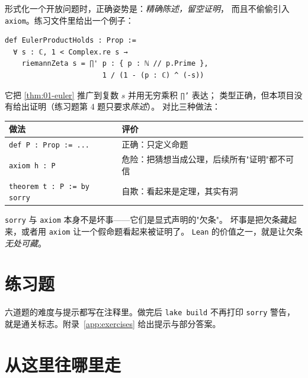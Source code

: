 形式化一个开放问题时，正确姿势是：\emph{精确陈述，留空证明}，
而且不偷偷引入 \texttt{axiom}。练习文件里给出一个例子：

\begin{lstlisting}[language=Lean,numbers=none,frame=none,xleftmargin=0pt]
def EulerProductHolds : Prop :=
  ∀ s : ℂ, 1 < Complex.re s →
    riemannZeta s = ∏' p : { p : ℕ // p.Prime },
                       1 / (1 - (p : ℂ) ^ (-s))
\end{lstlisting}

它把 \cref{thm:01-euler} 推广到复数 $s$ 并用无穷乘积 \texttt{∏'} 表达；
类型正确，但本项目没有给出证明（练习题第 4 题只要求\emph{陈述}）。
对比三种做法：

\begin{center}\small
\begin{tabular}{@{}p{}p{}@{}}
\toprule
\textbf{做法} & \textbf{评价}\\
\midrule
\texttt{def P : Prop := ...} & 正确：只定义命题\\
\texttt{axiom h : P} & 危险：把猜想当成公理，后续所有"证明"都不可信\\
\texttt{theorem t : P := by sorry} & 自欺：看起来是定理，其实有洞\\
\bottomrule
\end{tabular}
\end{center}

\begin{keybox}[形式化的伦理]
\texttt{sorry} 与 \texttt{axiom} 本身不是坏事——它们是显式声明的"欠条"。
坏事是把欠条藏起来，或者用 \texttt{axiom} 让一个假命题看起来被证明了。
\texttt{Lean} 的价值之一，就是让欠条\emph{无处可藏}。
\end{keybox}

\section{练习题}
\label{sec:08-exercises}


六道题的难度与提示都写在注释里。做完后 \texttt{lake build} 不再打印
\texttt{sorry} 警告，就是通关标志。附录~\ref{app:exercises} 给出提示与部分答案。

\section{从这里往哪里走}
\label{sec:08-next}

